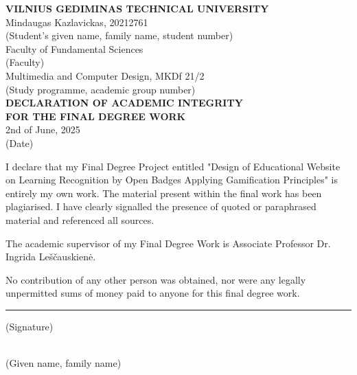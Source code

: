 \begin{center}
{\large\bfseries\scshape VILNIUS GEDIMINAS TECHNICAL UNIVERSITY}\\[1\baselineskip]
Mindaugas Kazlavickas, 20212761\\
{\footnotesize (Student's given name, family name, student number)}\\
Faculty of Fundamental Sciences\\
{\footnotesize (Faculty)}\\
Multimedia and Computer Design, MKDf 21/2\\
{\footnotesize (Study programme, academic group number)}\\[2\baselineskip]

{\large\bfseries DECLARATION OF ACADEMIC INTEGRITY}\\
{\large\bfseries FOR THE FINAL DEGREE WORK}\\[1\baselineskip]

2nd of June, 2025\\
{\footnotesize (Date)}\\[1\baselineskip]
\end{center}

I declare that my Final Degree Project entitled "Design of Educational Website on Learning Recognition by Open Badges Applying Gamification Principles" is entirely my own work. The material present within the final work has been plagiarised. I have clearly signalled the presence of quoted or paraphrased material and referenced all sources.

The academic supervisor of my Final Degree Work is Associate Professor Dr. Ingrida Leščauskienė.

No contribution of any other person was obtained, nor were any legally unpermitted sums of money paid to anyone for this final degree work.\\[2\baselineskip]
%
\begin{minipage}[t]{0.5\textwidth}
\end{minipage}
%
\hspace{\fill}
%
\begin{minipage}[t]{0.2\textwidth}
\centering\hrule\medskip\scriptsize (Signature)
\end{minipage}
%
\hspace{\fill}
%
\begin{minipage}[t]{0.3\textwidth}
\\
\medskip\scriptsize (Given name, family name)
\end{minipage}